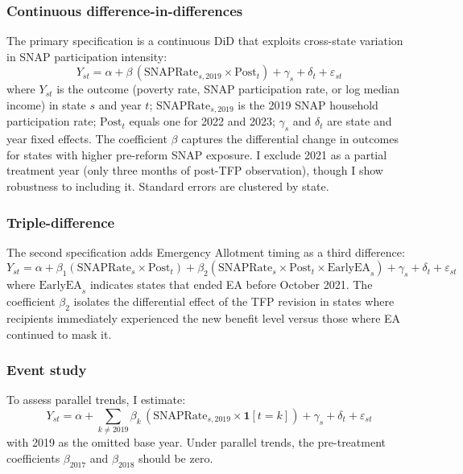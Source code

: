 \documentclass[12pt]{article}
\begin{document}
\subsubsection*{Continuous difference-in-differences} The primary specification is a continuous DiD that exploits cross-state variation in SNAP participation intensity:
\begin{equation}
\label{eq:did}
Y_{st} = \alpha + \beta \, (\text{SNAPRate}_{s,2019} \times \text{Post}_t) + \gamma_s + \delta_t + \varepsilon_{st}
\end{equation}
where $Y_{st}$ is the outcome (poverty rate, SNAP participation rate, or log median income) in state $s$ and year $t$; $\text{SNAPRate}_{s,2019}$ is the 2019 SNAP household participation rate; $\text{Post}_t$ equals one for 2022 and 2023; $\gamma_s$ and $\delta_t$ are state and year fixed effects. The coefficient $\beta$ captures the differential change in outcomes for states with higher pre-reform SNAP exposure. I exclude 2021 as a partial treatment year (only three months of post-TFP observation), though I show robustness to including it. Standard errors are clustered by state.

\subsubsection*{Triple-difference} The second specification adds Emergency Allotment timing as a third difference:
\begin{equation}
\label{eq:triple}
Y_{st} = \alpha + \beta_1 (\text{SNAPRate}_{s} \times \text{Post}_t) + \beta_2 (\text{SNAPRate}_{s} \times \text{Post}_t \times \text{EarlyEA}_s) + \gamma_s + \delta_t + \varepsilon_{st}
\end{equation}
where $\text{EarlyEA}_s$ indicates states that ended EA before October 2021. The coefficient $\beta_2$ isolates the differential effect of the TFP revision in states where recipients immediately experienced the new benefit level versus those where EA continued to mask it.

\subsubsection*{Event study} To assess parallel trends, I estimate:
\begin{equation}
\label{eq:event}
Y_{st} = \alpha + \sum_{k \neq 2019} \beta_k \, (\text{SNAPRate}_{s,2019} \times \mathbf{1}[t = k]) + \gamma_s + \delta_t + \varepsilon_{st}
\end{equation}
with 2019 as the omitted base year. Under parallel trends, the pre-treatment coefficients $\beta_{2017}$ and $\beta_{2018}$ should be zero.
\end{document}
